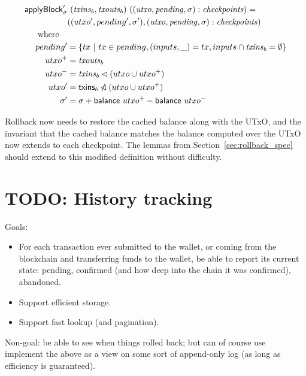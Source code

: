 \documentclass{article}
\newcommand{\restrictdom}{\lhd}
\newcommand{\subtractdom}{\mathbin{\slashed{\restrictdom}}}
\begin{document}
\begin{equation*}
\begin{split}
\mathsf{applyBlock}'_\sigma & ~ (\mathit{txins}_b, \mathit{txouts}_b) ~ ((\mathit{utxo}, \mathit{pending}, \sigma) : \mathit{checkpoints}) = \\
& ((utxo^\prime, pending^\prime, \sigma^\prime), (\mathit{utxo}, \mathit{pending}, \sigma) : \mathit{checkpoints}) \\
\text{where} \quad \\
    pending^\prime & = \{ tx ~|~ tx \in pending, (inputs, \_) = tx, inputs \cap \mathit{txins}_b = \emptyset \} \\
    utxo^+ & = \mathit{txouts}_b \\
    utxo^- & = \mathit{txins}_b \restrictdom (utxo \cup utxo^+) \\
    utxo^\prime & = \mathsf{txins}_b \subtractdom (utxo \cup utxo^+) \\
    \sigma^\prime & = \sigma + \mathsf{balance} ~ utxo^+ - \mathsf{balance} ~ utxo^- \\
\end{split}
\end{equation*}

Rollback now needs to restore the cached balance along with the UTxO, and the
invariant that the cached balance matches the balance computed over the UTxO
now extends to each checkpoint. The lemmas from Section~\ref{sec:rollback_spec}
should extend to this modified definition without difficulty.

\section{TODO: History tracking}

Goals:

\begin{itemize}
\item For each transaction ever submitted to the wallet, or coming from the
blockchain and transferring funds to the wallet, be able to report its current
state: pending, confirmed (and how deep into the chain it was confirmed),
abandoned.
\item Support efficient storage.
\item Support fast lookup (and pagination).
\end{itemize}

Non-goal: be able to see when things rolled back; but can of course use
implement the above as a view on some sort of append-only log
(as long as efficiency is guaranteed).
\end{document}
